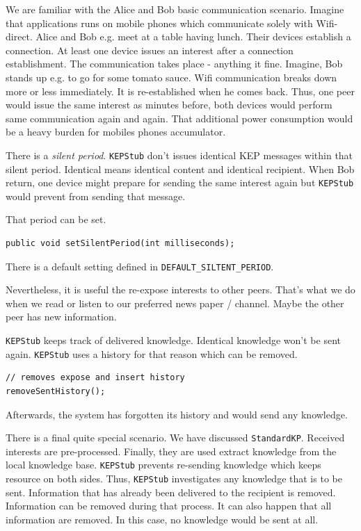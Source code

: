 We are familiar with the Alice and Bob basic communication scenario. Imagine that applications runs on mobile phones which communicate solely with Wifi-direct. Alice and Bob e.g. meet at a table having lunch. Their devices establish a connection. At least one device issues an interest after a connection establishment. The communication takes place - anything it fine.
Imagine, Bob stands up e.g. to go for some tomato sauce. Wifi communication breaks down more or less immediately. It is re-established when he comes back.
Thus, one peer would issue the same interest as minutes before, both devices would perform same communication again and again. That additional power consumption would be a heavy burden for mobiles phones accumulator.

There is a {\it silent period}. {\tt KEPStub} don't issues identical KEP messages within that silent period. Identical means identical content and identical recipient. When Bob return, one device might prepare for sending the same interest again but {\tt KEPStub} would prevent from sending that message.

That period can be set.
\begin{verbatim}
public void setSilentPeriod(int milliseconds);
\end{verbatim}

There is a default setting defined in {\tt DEFAULT\_SILTENT\_PERIOD}.

Nevertheless, it is useful the re-expose interests to other peers. That's what we do when we read or listen to our preferred news paper / channel. Maybe the other peer has new information.

{\tt KEPStub} keeps track of delivered knowledge. Identical knowledge won't be sent again. {\tt KEPStub} uses a history for that reason which can be removed.

\begin{verbatim}
// removes expose and insert history
removeSentHistory();
\end{verbatim}
Afterwards, the system has forgotten its history and would send any knowledge.

There is a final quite special scenario. 
We have discussed {\tt StandardKP}. Received interests are pre-processed. Finally, they are used extract knowledge from the local knowledge base. {\tt KEPStub} prevents re-sending knowledge which keeps resource on both sides.
Thus, {\tt KEPStub} investigates any knowledge that is to be sent. Information that has already been delivered to the recipient is removed. Information can be removed during that process. It can also happen that all information are removed. In this case, no knowledge would be sent at all.

